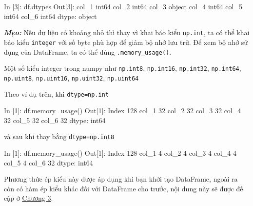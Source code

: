 \documentclass[
]{book}
\makeatletter
\newenvironment{Shaded}{\begin{snugshade}}{\end{snugshade}}
\newcommand{\BuiltInTok}[1]{#1}
\newcommand{\DecValTok}[1]{\textcolor[rgb]{0.00,0.00,0.81}{#1}}
\newcommand{\NormalTok}[1]{#1}
\newenvironment{kframe}{%
\medskip{}
\setlength{\fboxsep}{.8em}
 \def\at@end@of@kframe{}%
 \ifinner\ifhmode%
  \def\at@end@of@kframe{\end{minipage}}%
  \begin{minipage}{\columnwidth}%
 \fi\fi%
 \def\FrameCommand##1{\hskip\@totalleftmargin \hskip-\fboxsep
 \colorbox{shadecolor}{##1}\hskip-\fboxsep
     \hskip-\linewidth \hskip-\@totalleftmargin \hskip\columnwidth}%
 \MakeFramed {\advance\hsize-\width
   \@totalleftmargin\z@ \linewidth\hsize
   \@setminipage}}%
 {\par\unskip\endMakeFramed%
 \at@end@of@kframe}
\newenvironment{rmdblock}[1]
  {
  \begin{itemize}
  \renewcommand{\labelitemi}{
    \raisebox{-.7\height}[0pt][0pt]{
      {\setkeys{Gin}{width=3em,keepaspectratio}\texttt{[image: images/\#1]}}
    }
  }
  \setlength{\fboxsep}{1em}
  \begin{kframe}
  \item
  }
  {
  \end{kframe}
  \end{itemize}
  }
\newenvironment{rmdtip}
  {\begin{rmdblock}{tip}}
  {\end{rmdblock}}
\makeatother
\begin{document}
\begin{Shaded}
\begin{Highlighting}[]
\NormalTok{In [}\DecValTok{3}\NormalTok{]: df.dtypes}
\NormalTok{Out[}\DecValTok{3}\NormalTok{]:}
\NormalTok{col\_1     int64}
\NormalTok{col\_2     int64}
\NormalTok{col\_3    }\BuiltInTok{object}
\NormalTok{col\_4     int64}
\NormalTok{col\_5     int64}
\NormalTok{col\_6     int64}
\NormalTok{dtype: }\BuiltInTok{object}
\end{Highlighting}
\end{Shaded}

\begin{rmdtip}
\textbf{\emph{Mẹo:}}
Nếu dữ liệu có khoảng nhỏ thì thay vì khai báo kiểu \texttt{np.int}, ta có thể khai báo kiểu \texttt{integer} với số byte phù hợp để giảm bộ nhớ lưu trữ.
Để xem bộ nhớ sử dụng của DataFrame, ta có thể dùng \texttt{.memory\_usage()}.

Một số kiểu integer trong numpy như \texttt{np.int8}, \texttt{np.int16}, \texttt{np.int32}, \texttt{np.int64}, \texttt{np.uint8}, \texttt{np.uint16}, \texttt{np.uint32}, \texttt{np.uint64}
\end{rmdtip}
Theo ví dụ trên, khi \texttt{dtype=np.int}

\begin{Shaded}
\begin{Highlighting}[]
\NormalTok{In [}\DecValTok{1}\NormalTok{]:  df.memory\_usage()}
\NormalTok{Out[}\DecValTok{1}\NormalTok{]: }
\NormalTok{Index    }\DecValTok{128}
\NormalTok{col\_1     }\DecValTok{32}
\NormalTok{col\_2     }\DecValTok{32}
\NormalTok{col\_3     }\DecValTok{32}
\NormalTok{col\_4     }\DecValTok{32}
\NormalTok{col\_5     }\DecValTok{32}
\NormalTok{col\_6     }\DecValTok{32}
\NormalTok{dtype: int64}
\end{Highlighting}
\end{Shaded}

và sau khi thay bằng \texttt{dtype=np.int8}

\begin{Shaded}
\begin{Highlighting}[]
\NormalTok{In [}\DecValTok{1}\NormalTok{]:  df.memory\_usage()}
\NormalTok{Out[}\DecValTok{1}\NormalTok{]: }
\NormalTok{Index    }\DecValTok{128}
\NormalTok{col\_1      }\DecValTok{4}
\NormalTok{col\_2      }\DecValTok{4}
\NormalTok{col\_3      }\DecValTok{4}
\NormalTok{col\_4      }\DecValTok{4}
\NormalTok{col\_5      }\DecValTok{4}
\NormalTok{col\_6     }\DecValTok{32}
\NormalTok{dtype: int64}
\end{Highlighting}
\end{Shaded}

Phương thức ép kiểu này được áp dụng khi bạn khởi tạo DataFrame, ngoài ra còn có hàm ép kiểu khác đối với DataFrame cho trước, nội dung này sẽ được đề cập ở \protect\hyperlink{Chuong-3}{Chương 3}.
\end{document}
